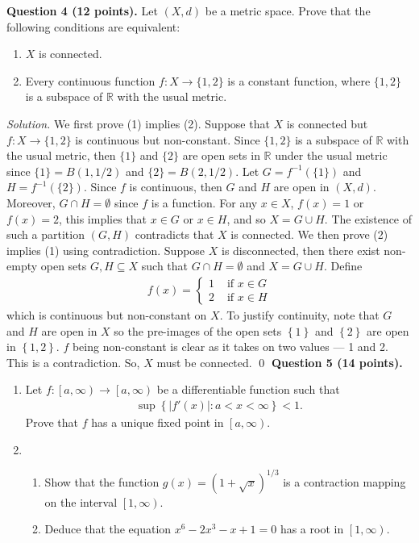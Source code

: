 \documentclass[11pt]{amsart}
\theoremstyle{plain}
\numberwithin{equation}{section}
\begin{document}
\noindent\textbf{Question 4 (12 points).} Let $(X,d)$ be a metric space. Prove that the following conditions are equivalent:
\begin{enumerate}
    \itemsep 0em
    \item $X$ is connected.
    \item Every continuous function $f:X\longrightarrow\{1,2\}$ is a constant function, where $\{1,2\}$ is a subspace of $\mathbb{R}$ with the usual metric.
\end{enumerate}
\noindent\emph{Solution.} We first prove (1) implies (2). Suppose that $X$ is connected but $f:X\longrightarrow\{1,2\}$ is continuous but non-constant. Since $\{1,2\}$ is a subspace of $\mathbb{R}$ with the usual metric, then $\{1\}$ and $\{2\}$ are open sets in $\mathbb{R}$ under the usual metric since $\{1\}=B\left(1,1/2\right)$ and $\{2\}=B\left(2,1/2\right)$. Let $G=f^{-1}\left(\{1\}\right)$ and $H=f^{-1}\left(\{2\}\right)$. Since $f$ is continuous, then $G$ and $H$ are open in $(X,d)$. Moreover, $G\cap H=\emptyset$ since $f$ is a function. For any $x\in X$, $f(x)=1$ or $f(x)=2$, this implies that $x\in G$ or $x\in H$, and so $X=G\cup H$. The existence of such a partition $\left(G,H\right)$ contradicts that $X$ is connected.
\newline
\newline We then prove (2) implies (1) using contradiction. Suppose $X$ is disconnected, then there exist non-empty open sets $G,H\subseteq X$ such that $G\cap H=\emptyset$ and $X=G\cup H$. Define
\begin{align*}
    f(x)=\begin{cases}
    1&\text{ if }x\in G
    \\
    2&\text{ if }x\in H
    \end{cases}
\end{align*}
which is continuous but non-constant on $X$. To justify continuity, note that $G$ and $H$ are open in $X$ so the pre-images of the open sets $\left\{1\right\}$ and $\left\{2\right\}$ are open in $\left\{1,2\right\}$. $f$ being non-constant is clear as it takes on two values --- 1 and 2. This is a contradiction. So, $X$ must be connected. \qed 
\newline
\newline\textbf{Question 5 (14 points).}
\begin{enumerate}[label=\textbf{(\alph*)}]
    \itemsep 0em
    \item Let $f:\left[a,\infty\right)\longrightarrow\left[a,\infty\right)$ be a differentiable function such that
\begin{align*}
    \sup\left\{\left|f'(x)\right|:a<x<\infty\right\}<1.
\end{align*}
Prove that $f$ has a unique fixed point in $\left[a,\infty\right)$. 
\item \begin{enumerate}[label=\textbf{(\roman*)}]
    \itemsep 0em
    \item  Show that the function $g(x)=\left(1+\sqrt{x}\right)^{1/3}$ is a contraction mapping on the
interval $\left[1,\infty\right)$.
\item Deduce that the equation $x^{6}-2x^{3}-x+1=0$ has a root in $\left[1,\infty\right)$.
\end{enumerate}
\end{enumerate}
\end{document}
